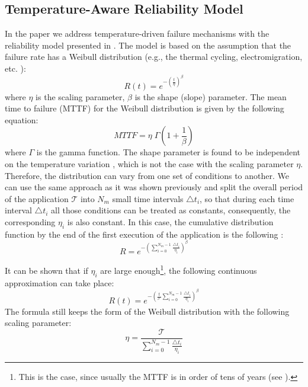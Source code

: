 \subsection{Temperature-Aware Reliability Model}
In the paper we address temperature-driven failure mechanisms with the reliability model presented in \cite{xiang2010}. The model is based on the assumption that the failure rate has a Weibull distribution (e.g., the thermal cycling, electromigration, etc. \cite{jedec2010}):
\[
  R(t) = e^{-(\frac{t}{\eta})^\beta}
\]
where $\eta$ is the scaling parameter, $\beta$ is the shape (slope) parameter. The mean time to failure (MTTF) for the Weibull distribution is given by the following equation:
\begin{equation} \label{eq:general-mttf}
  MTTF = \eta \; \Gamma(1 + \frac{1}{\beta})
\end{equation}
where $\Gamma$ is the gamma function. The shape parameter is found to be independent on the temperature variation \cite{chang2006}, which is not the case with the scaling parameter $\eta$. Therefore, the distribution can vary from one set of conditions to another. We can use the same approach as it was shown previously and split the overall period of the application $\mathcal{T}$ into $N_m$ small time intervals $\triangle t_i$, so that during each time interval $\triangle t_i$ all those conditions can be treated as constants, consequently, the corresponding $\eta_i$ is also constant. In this case, the cumulative distribution function by the end of the first execution of the application is the following \cite{xiang2010}:
\[
  R = e^{-(\sum_{i=0}^{N_m - 1} \frac{\triangle t_i}{\eta_i})^\beta}
\]

It can be shown that if $\eta_i$ are large enough\footnote{This is the case, since usually the MTTF is in order of tens of years (see ).}, the following continuous approximation can take place:
\[
  R(t) = e^{-(\frac{t}{\mathcal{T}} \sum_{i=0}^{N_m - 1} \frac{\triangle t_i}{\eta_i})^\beta}
\]
The formula still keeps the form of the Weibull distribution with the following scaling parameter:
\[
  \eta = \frac{\mathcal{T}}{\sum_{i=0}^{N_m - 1} \frac{\triangle t_i}{\eta_i}}
\]

